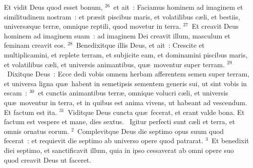  Et vidit Deus quod esset bonum,
${}^{26}$~et ait~: Faciamus hominem ad imaginem et similitudinem nostram~: et pr\ae sit piscibus maris, et volatilibus c\ae li, et bestiis, univers\ae que terr\ae , omnique reptili, quod movetur in terra.
${}^{27}$~Et creavit Deus hominem ad imaginem suam~: ad imaginem Dei creavit illum, masculum et feminam creavit eos.
${}^{28}$~Benedixitque illis Deus, et ait~: Crescite et multiplicamini, et replete terram, et subjicite eam, et dominamini piscibus maris, et volatilibus c\ae li, et universis animantibus, qu\ae\ moventur super terram.
${}^{29}$~Dixitque Deus~: Ecce dedi vobis omnem herbam afferentem semen super terram, et universa ligna qu\ae\ habent in semetipsis sementem generis sui, ut sint vobis in escam~:
${}^{30}$~et cunctis animantibus terr\ae , omnique volucri c\ae li, et universis qu\ae\ moventur in terra, et in quibus est anima vivens, ut habeant ad vescendum. Et factum est ita.
${}^{31}$~Viditque Deus cuncta qu\ae\ fecerat, et erant valde bona. Et factum est vespere et mane, dies sextus.
~Igitur perfecti sunt c\ae li et terra, et omnis ornatus eorum.
${}^{2}$~Complevitque Deus die septimo opus suum quod fecerat~: et requievit die septimo ab universo opere quod patrarat.
${}^{3}$~Et benedixit diei septimo, et sanctificavit illum, quia in ipso cessaverat ab omni opere suo quod creavit Deus ut faceret.


